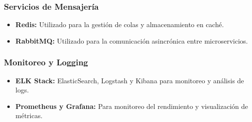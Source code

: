 \subsubsection{Servicios de Mensajería}
\begin{itemize}
    \item \textbf{Redis:} Utilizado para la gestión de colas y almacenamiento en caché.
    \item \textbf{RabbitMQ:} Utilizado para la comunicación asincrónica entre microservicios.
\end{itemize}

\subsubsection{Monitoreo y Logging}
\begin{itemize}
    \item \textbf{ELK Stack:} ElasticSearch, Logstash y Kibana para monitoreo y análisis de logs.
    \item \textbf{Prometheus y Grafana:} Para monitoreo del rendimiento y visualización de métricas.
\end{itemize}


